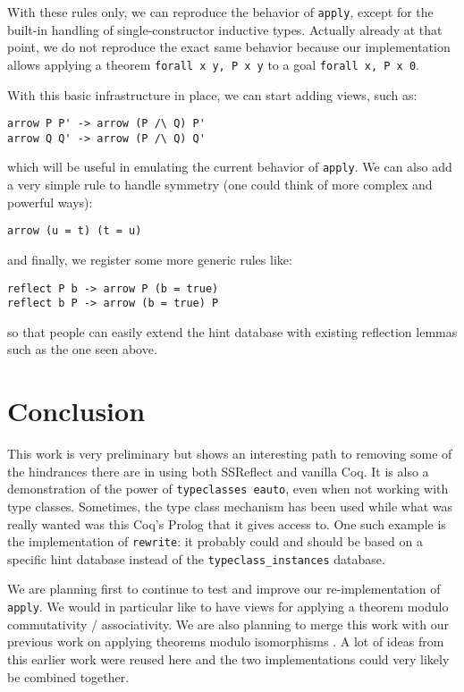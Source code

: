 \documentclass[nocopyrightspace,blockstyle,numbers]{sigplanconf}
\begin{document}
With these rules only, we can reproduce the behavior of
\texttt{apply}, except for the built-in handling of
single-constructor inductive types.
Actually already at that point, we do not reproduce the
exact same behavior because our implementation allows
applying a theorem \texttt{forall x y, P x y}
to a goal \texttt{forall x, P x 0}.

With this basic infrastructure in place, we can start
adding views, such as:

\begin{verbatim}
arrow P P' -> arrow (P /\ Q) P'
arrow Q Q' -> arrow (P /\ Q) Q'
\end{verbatim}
which will be useful in emulating the current behavior
of \texttt{apply}. We can also add a very simple rule to
handle symmetry (one could think of more complex and
powerful ways):

\begin{verbatim}
arrow (u = t) (t = u)
\end{verbatim}
and finally, we register some more generic rules like:

\begin{verbatim}
reflect P b -> arrow P (b = true)
reflect b P -> arrow (b = true) P
\end{verbatim}
so that people can easily extend the hint database with
existing reflection lemmas such as the one seen above.

\section{Conclusion}

This work is very preliminary but shows an interesting path
to removing some of the hindrances there are in using
both SSReflect and vanilla Coq.
It is also a demonstration of the power of
\texttt{typeclasses eauto}, even when not working with
type classes.
Sometimes, the type class mechanism has been used while what
was really wanted was this Coq's Prolog that it gives access to.
One such example is the implementation of \texttt{rewrite}:
it probably could and should be based on a specific hint
database instead of the \texttt{typeclass\_instances} database.

We are planning first to continue to test and improve our
re-implementation of \texttt{apply}. We would in particular like
to have views for applying a theorem modulo commutativity /
associativity. We are also planning to merge this work with our
previous work on applying theorems modulo isomorphisms
\cite{zimmermann}. A lot of ideas from this earlier work were
reused here and the two implementations could very likely be
combined together.
\end{document}

